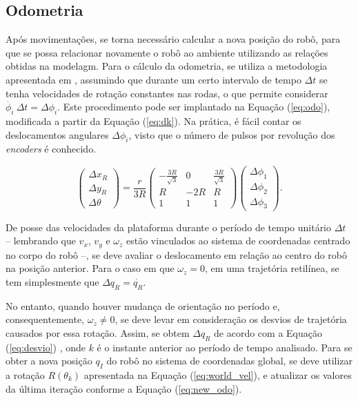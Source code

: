 \subsection{Odometria}

Após movimentações, se torna necessário calcular a nova posição do robô, para que se possa relacionar novamente o robô ao ambiente utilizando as relações obtidas na modelagm. Para o cálculo da odometria, se utiliza a metodologia apresentada em \citet{lynch2017modern}, assumindo que durante um certo intervalo de tempo $\Delta t$ se tenha velocidades de rotação constantes nas rodas, o que permite considerar $\dot{\phi_i}\ \Delta t = \Delta \phi_i$. Este procedimento pode ser implantado na Equação (\ref{eq:odo}), modificada a partir da Equação (\ref{eq:dk}). Na prática, é fácil contar os deslocamentos angulares $\Delta \phi_i$, visto que o número de pulsos por revolução dos \textit{encoders} é conhecido.

\begin{equation}
  \begin{pmatrix}
    \Delta x_R \\
    \Delta y_R \\
    \Delta\theta
  \end{pmatrix}
  =
  \frac{r}{3R}
  \begin{pmatrix}
    -\frac{3R}{\sqrt{3}} & 0   & \frac{3R}{\sqrt{3}} \\
    R                    & -2R & R                   \\
    1                    & 1   & 1
  \end{pmatrix}
  \begin{pmatrix}
    \Delta{\phi_1} \\
    \Delta{\phi_2} \\
    \Delta{\phi_3}
  \end{pmatrix}.
  \label{eq:odo}
\end{equation}

De posse das velocidades da plataforma durante o período de tempo unitário $\Delta t$ -- lembrando que $v_x$, $v_y$ e $\omega_z$ estão vinculados ao sistema de coordenadas centrado no corpo do robô --, se deve avaliar o deslocamento em relação ao centro do robô na posição anterior. Para o caso em que $\omega_z = 0$, em uma trajetória retilínea, se tem simplesmente que $\Delta q_R = \dot{q_R}$.

No entanto, quando houver mudança de orientação no período e, consequentemente, $\omega_z \neq 0$, se deve levar em consideração os desvios de trajetória causados por essa rotação. Assim, se obtem $\Delta q_R$ de acordo com a Equação (\ref{eq:desvio}) \citep{lynch2017modern}, onde $k$ é o instante anterior ao período de tempo analisado. Para se obter a nova posição $q_I$ do robô no sistema de coordenadas global, se deve utilizar a rotação $R(\theta_k)$ apresentada na Equação (\ref{eq:world_vel}), e atualizar os valores da última iteração conforme a Equação (\ref{eq:new_odo}).


